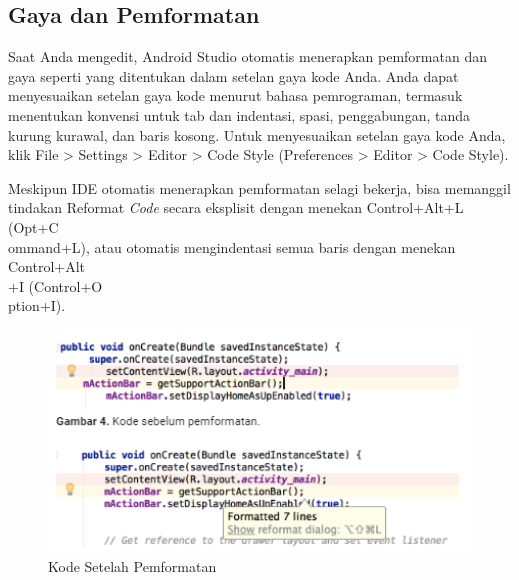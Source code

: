 \subsection{Gaya dan Pemformatan}
\par Saat Anda mengedit, Android Studio otomatis menerapkan pemformatan dan gaya seperti yang ditentukan dalam setelan gaya kode Anda. Anda dapat menyesuaikan setelan gaya kode menurut bahasa pemrograman, termasuk menentukan konvensi untuk tab dan indentasi, spasi, penggabungan, tanda kurung kurawal, dan baris kosong. Untuk menyesuaikan setelan gaya kode Anda, klik File > Settings > Editor > Code Style (Preferences > Editor > Code Style).
\par Meskipun IDE otomatis menerapkan pemformatan selagi bekerja, bisa memanggil tindakan Reformat \textit{Code} secara eksplisit dengan menekan Control+Alt+L (Opt+C\\ommand+L), atau otomatis mengindentasi semua baris dengan menekan Control+Alt\\+I (Control+O\\ption+I).
    \begin{figure}[H]
    \centering
    \includegraphics[width=1\textwidth]{figures/android9.png}
    \caption{  Kode Setelah Pemformatan}
    \label{print}
    \end{figure}
